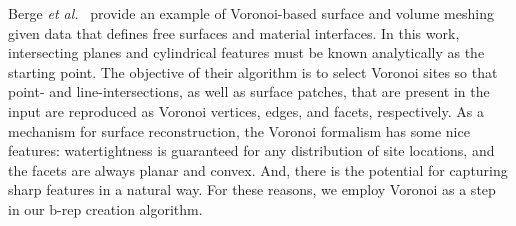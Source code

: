 Berge \textit{et al.}~\cite{berge2019} provide an example of Voronoi-based surface and volume meshing given data that defines free surfaces and material interfaces.  In this work, intersecting planes and cylindrical features must be known analytically as the starting point. The objective of their algorithm is to select Voronoi sites so that point- and line-intersections, as well as surface patches, that are present in the input are reproduced as Voronoi vertices, edges, and facets, respectively.  As a mechanism for surface reconstruction, the Voronoi formalism has some nice features:  watertightness is guaranteed for any distribution of site locations, and the facets are always planar and convex.  And, there is the potential for capturing sharp features in a natural way.  For these reasons, we employ Voronoi as a step in our b-rep creation algorithm.